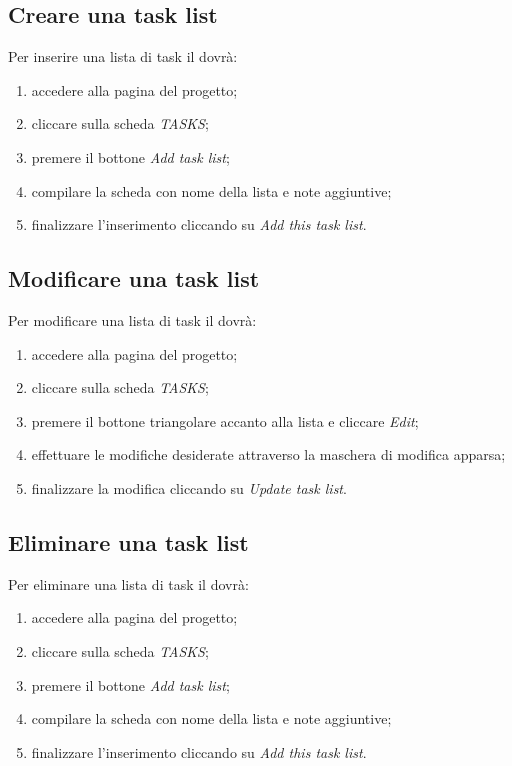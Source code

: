 		\subsection{Creare una task list}
			Per inserire una lista di task il  dovrà:
			\begin{enumerate}
				\item accedere alla pagina del progetto;
				\item cliccare sulla scheda \textit{TASKS};
				\item premere il bottone \textit{Add task list};
				\item compilare la scheda con nome della lista e note aggiuntive;
				\item finalizzare l'inserimento cliccando su \textit{Add this task list}.
			\end{enumerate}
			
		\subsection{Modificare una task list}
			Per modificare una lista di task il  dovrà:
			\begin{enumerate}
				\item accedere alla pagina del progetto;
				\item cliccare sulla scheda \textit{TASKS};
				\item premere il bottone triangolare accanto alla lista e cliccare \textit{Edit};
				\item effettuare le modifiche desiderate attraverso la maschera di modifica apparsa;
				\item finalizzare la modifica cliccando su \textit{Update task list}.
			\end{enumerate}
			
		\subsection{Eliminare una task list}
			Per eliminare una lista di task il  dovrà:
			\begin{enumerate}
				\item accedere alla pagina del progetto;
				\item cliccare sulla scheda \textit{TASKS};
				\item premere il bottone \textit{Add task list};
				\item compilare la scheda con nome della lista e note aggiuntive;
				\item finalizzare l'inserimento cliccando su \textit{Add this task list}.
			\end{enumerate}
			

